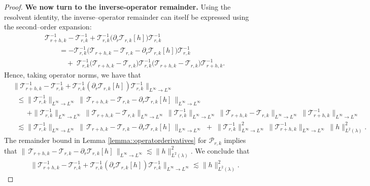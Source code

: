 \documentclass[11pt]{article}
\theoremstyle{plain}
\begin{document}
\begin{proof}
\noindent \textbf{We now turn to the inverse-operator remainder.} Using the resolvent identity, the inverse–operator remainder can itself be expressed using the second–order expansion:
\[
\begin{aligned}
&\mathcal{T}_{r+h,k}^{-1} - \mathcal{T}_{r,k}^{-1}
  + \mathcal{T}_{r,k}^{-1}\big(\partial_r \mathcal{T}_{r,k}[h]\big)\mathcal{T}_{r,k}^{-1} \\
&\qquad=-  \mathcal{T}_{r,k}^{-1}\Big( \mathcal{T}_{r+h,k} - \mathcal{T}_{r,k}  - \partial_r \mathcal{T}_{r,k}[h] \Big)\mathcal{T}_{r,k}^{-1} \\
&\qquad\quad +\; \mathcal{T}_{r,k}^{-1}\big(\mathcal{T}_{r+h,k} - \mathcal{T}_{r,k}\big)\mathcal{T}_{r,k}^{-1}\big(\mathcal{T}_{r+h,k} - \mathcal{T}_{r,k}\big)\mathcal{T}_{r+h,k}^{-1}.
\end{aligned}
\]
Hence, taking operator norms, we have that
\[
\begin{aligned}
& \big\|\mathcal{T}_{r+h,k}^{-1} - \mathcal{T}_{r,k}^{-1}
+ \mathcal{T}_{r,k}^{-1}(\partial_r \mathcal{T}_{r,k}[h])\mathcal{T}_{r,k}^{-1}\big\|_{L^\infty \to L^\infty} \\
&\;\;\le  \|\mathcal{T}_{r,k}^{-1}\|_{L^\infty \to L^\infty}\,
   \big\|\,\mathcal{T}_{r+h,k} - \mathcal{T}_{r,k} - \partial_r \mathcal{T}_{r,k}[h]\,\big\|_{L^\infty \to L^\infty}  \\
&\qquad + \|\mathcal{T}_{r,k}^{-1}\|_{L^\infty \to L^\infty}\,
   \|\mathcal{T}_{r+h,k} - \mathcal{T}_{r,k}\|_{L^\infty \to L^\infty}\,
   \|\mathcal{T}_{r,k}^{-1}\|_{L^\infty \to L^\infty}\,
   \|\mathcal{T}_{r+h,k} - \mathcal{T}_{r,k}\|_{L^\infty \to L^\infty}\,
   \|\mathcal{T}_{r+h,k}^{-1}\|_{L^\infty \to L^\infty} \\
&\;\;\lesssim \|\mathcal{T}_{r,k}^{-1}\|_{L^\infty \to L^\infty}\,
   \big\|\,\mathcal{T}_{r+h,k} - \mathcal{T}_{r,k} - \partial_r \mathcal{T}_{r,k}[h]\,\big\|_{L^\infty \to L^\infty}
   \;+\; \|\mathcal{T}_{r,k}^{-1}\|_{L^\infty \to L^\infty}^2\,
   \|\mathcal{T}_{r+h,k}^{-1}\|_{L^\infty \to L^\infty}\,\|h\|_{L^2(\lambda)}^2 .
\end{aligned}
\]
The remainder bound in Lemma \ref{lemma::operatorderivatives} for $\mathcal{P}_{r, k}$ implies that $\big\|\,\mathcal{T}_{r+h,k} - \mathcal{T}_{r,k} - \partial_r \mathcal{T}_{r,k}[h]\,\big\|_{L^\infty \to L^\infty}   
 \lesssim \|h\|_{L^2(\lambda)}^2.$
We conclude that
\[
\begin{aligned}
& \big\|\mathcal{T}_{r+h,k}^{-1} - \mathcal{T}_{r,k}^{-1}
+ \mathcal{T}_{r,k}^{-1}(\partial_r \mathcal{T}_{r,k}[h])\mathcal{T}_{r,k}^{-1}\big\|_{L^\infty \to L^\infty} \lesssim   \|h\|_{L^2(\lambda)}^2.
\end{aligned}
\]



\end{proof}
\end{document}
